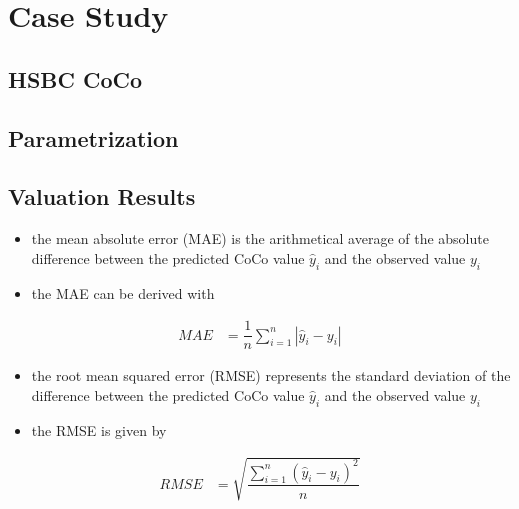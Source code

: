 \chapter{Case Study}\label{empiricalanalysis}

\section{HSBC CoCo}

\section{Parametrization}

\section{Valuation Results}

\begin{itemize}
\item the mean absolute error (MAE) is the arithmetical average of the absolute difference between the predicted CoCo value $\hat{y}_i$ and the observed value $y_i$
\item the MAE can be derived with
\end{itemize}
\begin{align}
MAE &= \dfrac{1}{n} \sum_{i=1}^{n} |\hat{y}_i - y_i | 
\end{align}

\begin{itemize}
\item the root mean squared error (RMSE) represents the standard deviation of the difference between the predicted CoCo value $\hat{y}_i$ and the observed value $y_i$
\item the RMSE is given by
\end{itemize}
\begin{align}
RMSE &= \sqrt{\dfrac{\sum_{i=1}^{n} \left( \hat{y}_i - y_i \right)^2}{n}}
\end{align}
